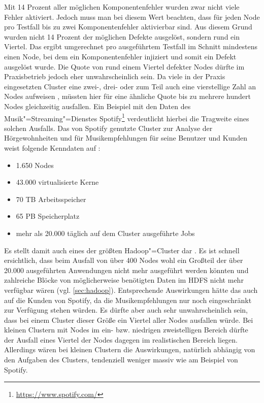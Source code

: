 Mit 14 Prozent aller möglichen Komponentenfehler wurden zwar nicht viele Fehler aktiviert.
Jedoch muss man bei diesem Wert beachten, dass für jeden Node pro Testfall bis zu zwei Komponentenfehler aktivierbar sind.
Aus diesem Grund wurden nicht 14 Prozent der möglichen Defekte ausgelöst, sondern rund ein Viertel.
Das ergibt umgerechnet pro ausgeführtem Testfall im Schnitt mindestens einen Node, bei dem ein Komponentenfehler injiziert und somit ein Defekt ausgelöst wurde.
Die Quote von rund einem Viertel defekter Nodes dürfte im Praxisbetrieb jedoch eher unwahrscheinlich sein.
Da viele in der Praxis eingesetzten Cluster eine zwei-, drei- oder zum Teil auch eine vierstellige Zahl an Nodes aufweisen \cite{PoweredByHadoop}, müssten hier für eine ähnliche Quote bis zu mehrere hundert Nodes gleichzeitig ausfallen.
Ein Beispiel mit den Daten des Musik"=Streaming"=Dienstes Spotify\footnote{\url{https://www.spotify.com/}} verdeutlicht hierbei die Tragweite eines solchen Ausfalls.
Das von Spotify genutzte Cluster zur Analyse der Hörgewohnheiten und für Musikempfehlungen für seine Benutzer und Kunden weist folgende Kenndaten auf \cite{PoweredByHadoop}:

\begin{itemize}
    \item 1.650 Nodes
    \item 43.000 virtualisierte Kerne
    \item 70 TB Arbeitsspeicher
    \item 65 PB Speicherplatz
    \item mehr als 20.000 täglich auf dem Cluster ausgeführte Jobs
\end{itemize}

Es stellt damit auch eines der größten Hadoop"=Cluster dar \cite{PoweredByHadoop}.
Es ist schnell ersichtlich, dass beim Ausfall von über 400 Nodes wohl ein Großteil der über 20.000 ausgeführten Anwendungen nicht mehr ausgeführt werden könnten und zahlreiche Blöcke von möglicherweise benötigten Daten im HDFS nicht mehr verfügbar wären (vgl. \cref{sec:hadoop}).
Entsprechende Auswirkungen hätte das auch auf die Kunden von Spotify, da \uA die Musikempfehlungen nur noch eingeschränkt zur Verfügung stehen würden.
Es dürfte aber auch sehr unwahrscheinlich sein, dass bei einem Cluster dieser Größe ein Viertel aller Nodes ausfallen würde.
Bei kleinen Clustern mit Nodes im ein- bzw. niedrigen zweistelligen Bereich dürfte der Ausfall eines Viertel der Nodes dagegen im realistischen Bereich liegen.
Allerdings wären bei kleinen Clustern die Auswirkungen, natürlich abhängig von den Aufgaben des Clusters, tendenziell weniger massiv wie am Beispiel von Spotify.

